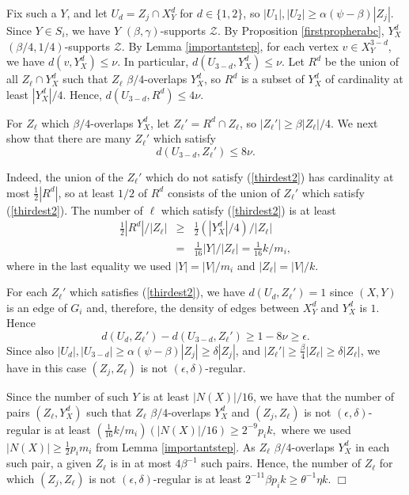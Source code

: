 \documentclass[11pt]{article}
\newenvironment{proof}
      {\medskip\noindent{\bf Proof:}\hspace{1mm}}
      {\hfill$\Box$\medskip}
\begin{document}
\begin{proof}
Fix such a $Y$, and let $U_d=Z_j \cap X^d_Y$ for $d \in \{1,2\}$, so
$|U_1|,|U_2| \geq \alpha(\psi-\beta)|Z_j|$. Since $Y \in S_i$, we have
$Y$ $(\beta,\gamma)$-supports $\mathcal{Z}$. By Proposition
\ref{firstpropherabc}, $Y^d_X$ $(\beta/4,1/4)$-supports
$\mathcal{Z}$. By Lemma \ref{importantstep}, for each vertex $v \in X^{3-d}_Y$,
we have $d(v,Y^{d}_X) \leq \nu$. In particular, $d(U_{3-d},Y^d_X) \leq \nu$.
Let $R^d$ be the union of all $Z_{\ell} \cap Y^d_X$ such that
$Z_{\ell}$
$\beta/4$-overlaps $Y^d_X$, so $R^d$ is a subset of $Y^d_X$ of cardinality at
least $|Y^d_X|/4$. Hence, $d(U_{3-d},R^d) \leq 4\nu$.

For $Z_{\ell}$ which $\beta/4$-overlaps $Y^d_X$, let $Z_{\ell}'=R^d \cap
Z_{\ell}$, so $|Z_{\ell}'|
\geq \beta|Z_{\ell}|/4$. We next show that there are many $Z_{\ell}'$ which
satisfy
\begin{equation}\label{thirdest2}
d(U_{3-d},Z_{\ell}') \leq 8 \nu.
\end{equation}

Indeed, the union of the $Z_{\ell}'$ which do not satisfy (\ref{thirdest2}) has
cardinality at most $\frac{1}{2}|R^d|$, so at least
$1/2$ of $R^d$ consists of the union of $Z_{\ell}'$ which satisfy
(\ref{thirdest2}).
The number of ${\ell}$ which satisfy
(\ref{thirdest2}) is at least
\begin{eqnarray*} \frac{1}{2}|R^d|/|Z_{\ell}| & \geq &
\frac{1}{2}(|Y^d_X|/4)/|Z_{\ell}| \\
& = & \frac{1}{16}|Y|/|Z_{\ell}| = \frac{1}{16}k/m_i,
\end{eqnarray*}
where in the last equality we used $|Y| = |V|/m_i$ and $|Z_{\ell}|=|V|/k$.

For each $Z_{\ell}'$ which satisfies (\ref{thirdest2}), we have $d(U_d,Z_{\ell}')=1$
since $(X,Y)$ is an edge of $G_i$ and, therefore, the density of edges between
$X_Y^d$ and $Y_X^d$ is $1$.
Hence
$$d(U_d,Z_{\ell}')-d(U_{3-d},Z_{\ell}') \geq 1-8\nu \geq \epsilon.$$
Since also $|U_d|,|U_{3-d}| \geq \alpha(\psi-\beta)|Z_j| \geq \delta |Z_j|$,
and $|Z_{\ell}'| \geq \frac{\beta}{4} |Z_{\ell}| \geq \delta |Z_{\ell}|$,
we have in this case $(Z_j,Z_{\ell})$ is not $(\epsilon,\delta)$-regular.

Since the number of such $Y$ is at least $|N(X)|/16$, we have that the number
of pairs $(Z_{\ell},Y^d_X)$ such that $Z_{\ell}$ $\beta/4$-overlaps $Y^d_X$ and
$(Z_j,Z_{\ell})$ is not $(\epsilon,\delta)$-regular is at least
$\left(\frac{1}{16}k/m_i\right)\left(|N(X)|/16\right) \geq
2^{-9}p_ik,$ where we used $|N(X)| \geq \frac{1}{2}p_im_i$ from Lemma
\ref{importantstep}. As $Z_{\ell}$ $\beta/4$-overlaps $Y^d_X$ in each such
pair, a
given $Z_{\ell}$ is in at most $4\beta^{-1}$ such pairs. Hence, the number of
$Z_{\ell}$
for which $(Z_j,Z_{\ell})$ is not $(\epsilon,\delta)$-regular is at least
$2^{-11}\beta p_ik \geq \theta^{-1}\eta k.$
\end{proof}
\end{document}
